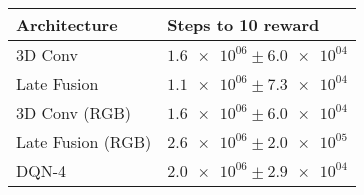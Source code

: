 \begin{tabular}{ll}
\hline
 Architecture      & Steps to 10 reward                \\
\hline
 3D Conv           & $\num{1.6e+06} \pm \num{6.0e+04}$ \\
 Late Fusion       & $\num{1.1e+06} \pm \num{7.3e+04}$ \\
 3D Conv (RGB)     & $\num{1.6e+06} \pm \num{6.0e+04}$ \\
 Late Fusion (RGB) & $\num{2.6e+06} \pm \num{2.0e+05}$ \\
 DQN-4             & $\num{2.0e+06} \pm \num{2.9e+04}$ \\
\hline
\end{tabular}